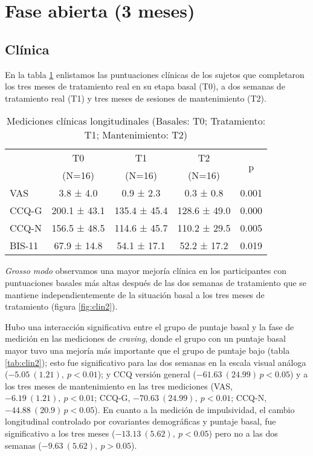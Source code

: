 \section{Fase abierta (3 meses)}
\subsection{Clínica}
En la tabla \ref{tab:cl2} enlistamos las puntuaciones clínicas de los sujetos que completaron los tres meses de tratamiento real en su etapa basal (T0), a dos semanas de tratamiento real (T1) y tres meses de sesiones de mantenimiento (T2).

\begin{table}[!htb]
    \centering
    \small
    \caption{Mediciones clínicas longitudinales (Basales: T0; Tratamiento: T1; Mantenimiento: T2)}
    \label{tab:cl2}
\begin{tabular}{lcccc}
\hline
 & T0 & T1 & T2 & \multirow{2}{*}{p}\\
 & (N=16) & (N=16) & (N=16) &  \\
\hline
VAS   &  3.8 ±  4.0 &  0.9 ±  2.3 &  0.3 ±  0.8 & 0.001\\
CCQ-G  & 200.1 ± 43.1 & 135.4 ± 45.4 & 128.6 ± 49.0 & 0.000\\
CCQ-N  & 156.5 ± 48.5 & 114.6 ± 45.7 & 110.2 ± 29.5 & 0.005\\
BIS-11 & 67.9 ± 14.8 & 54.1 ± 17.1 & 52.2 ± 17.2 & 0.019\\
\hline
\end{tabular}
\end{table}

\textit{Grosso modo} observamos una mayor mejoría clínica en los participantes con puntuaciones basales más altas después de las dos semanas de tratamiento que se mantiene independientemente de la situación basal a los tres meses de tratamiento (figura \ref{fig:clin2}).\par
Hubo una interacción significativa entre el grupo de puntaje basal y la fase de medición en las mediciones de \textit{craving}, donde el grupo con un puntaje basal mayor tuvo una mejoría más importante que el grupo de puntaje bajo (tabla \ref{tab:clin2}); esto fue significativo para las dos semanas en la escala visual análoga ($-5.05\ (1.21),\ p<0.01$); y CCQ versión general ($-61.63\ (24.99)\, p<0.05$) y a los tres meses de mantenimiento en las tres mediciones (VAS, $-6.19\ (1.21),\ p<0.01$; CCQ-G, $-70.63\ (24.99),\ p<0.01$; CCQ-N, $-44.88\ (20.9)\, p<0.05$). En cuanto a la medición de impulsividad, el cambio longitudinal controlado por covariantes demográficas y puntaje basal, fue significativo a los tres meses ($-13.13\ (5.62),\ p<0.05$) pero no a las dos semanas ($-9.63\ (5.62),\ p>0.05$).

